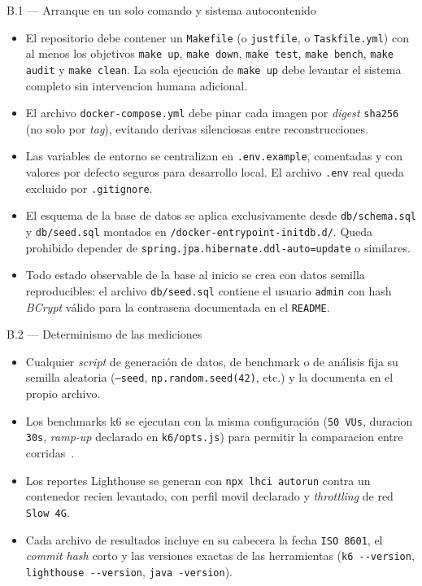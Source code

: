\documentclass[11pt,a4paper]{article}
\begin{document}
\begin{cajarepo}{B.1 --- Arranque en un solo comando y sistema autocontenido}
    \begin{itemize}
        \item El repositorio debe contener un \texttt{Makefile} (o \texttt{justfile}, o \texttt{Taskfile.yml}) con al menos los objetivos \texttt{make up}, \texttt{make down}, \texttt{make test}, \texttt{make bench}, \texttt{make audit} y \texttt{make clean}. La sola ejecuci\'{o}n de \texttt{make up} debe levantar el sistema completo sin intervencion humana adicional.
        \item El archivo \texttt{docker-compose.yml} debe pinar cada imagen por \emph{digest} \texttt{sha256} (no solo por \emph{tag}), evitando derivas silenciosas entre reconstrucciones.
        \item Las variables de entorno se centralizan en \texttt{.env.example}, comentadas y con valores por defecto seguros para desarrollo local. El archivo \texttt{.env} real queda excluido por \texttt{.gitignore}.
        \item El esquema de la base de datos se aplica exclusivamente desde \texttt{db/schema.sql} y \texttt{db/seed.sql} montados en \texttt{/docker-entrypoint-initdb.d/}. Queda prohibido depender de \texttt{spring.jpa.hibernate.ddl-auto=update} o similares.
        \item Todo estado observable de la base al inicio se crea con datos semilla reproducibles: el archivo \texttt{db/seed.sql} contiene el usuario \texttt{admin} con hash \emph{BCrypt} v\'{a}lido para la contrasena documentada en el \texttt{README}.
    \end{itemize}
\end{cajarepo}

\begin{cajarepo}{B.2 --- Determinismo de las mediciones}
    \begin{itemize}
        \item Cualquier \emph{script} de generaci\'{o}n de datos, de benchmark o de an\'{a}lisis fija su semilla aleatoria (\texttt{--seed}, \texttt{np.random.seed(42)}, etc.) y la documenta en el propio archivo.
        \item Los benchmarks k6 se ejecutan con la misma configuraci\'{o}n (\texttt{50 VUs}, duracion \texttt{30s}, \emph{ramp-up} declarado en \texttt{k6/opts.js}) para permitir la comparacion entre corridas~\cite{ortega2022securecoding}.
        \item Los reportes Lighthouse se generan con \texttt{npx lhci autorun} contra un contenedor recien levantado, con perfil movil declarado y \emph{throttling} de red \texttt{Slow 4G}.
        \item Cada archivo de resultados incluye en su cabecera la fecha \texttt{ISO 8601}, el \emph{commit hash} corto y las versiones exactas de las herramientas (\texttt{k6 -{-}version}, \texttt{lighthouse -{-}version}, \texttt{java -version}).
    \end{itemize}
\end{cajarepo}
\end{document}
